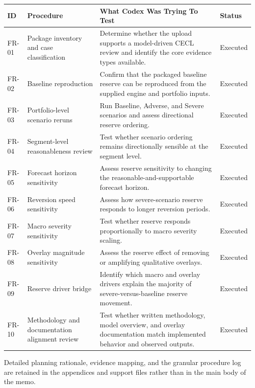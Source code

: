 \documentclass[11pt]{article}
\begin{document}
\begin{center}
\small
\begin{tabularx}{\textwidth}{>{\raggedright\arraybackslash}p{}>{\raggedright\arraybackslash}p{}>{\raggedright\arraybackslash}p{}>{\raggedright\arraybackslash}p{}}
\toprule
ID & Procedure & What Codex Was Trying To Test & Status \\
\midrule
FR-01 & Package inventory and case classification & Determine whether the upload supports a model-driven CECL review and identify the core evidence types available. & Executed \\
FR-02 & Baseline reproduction & Confirm that the packaged baseline reserve can be reproduced from the supplied engine and portfolio inputs. & Executed \\
FR-03 & Portfolio-level scenario reruns & Run Baseline, Adverse, and Severe scenarios and assess directional reserve ordering. & Executed \\
FR-04 & Segment-level reasonableness review & Test whether scenario ordering remains directionally sensible at the segment level. & Executed \\
FR-05 & Forecast horizon sensitivity & Assess reserve sensitivity to changing the reasonable-and-supportable forecast horizon. & Executed \\
FR-06 & Reversion speed sensitivity & Assess how severe-scenario reserve responds to longer reversion periods. & Executed \\
FR-07 & Macro severity sensitivity & Test whether reserve responds proportionally to macro severity scaling. & Executed \\
FR-08 & Overlay magnitude sensitivity & Assess the reserve effect of removing or amplifying qualitative overlays. & Executed \\
FR-09 & Reserve driver bridge & Identify which macro and overlay drivers explain the majority of severe-versus-baseline reserve movement. & Executed \\
FR-10 & Methodology and documentation alignment review & Test whether written methodology, model overview, and overlay documentation match implemented behavior and observed outputs. & Executed \\
\bottomrule
\end{tabularx}
\normalsize
\end{center}
Detailed planning rationale, evidence mapping, and the granular procedure log are retained in the appendices and support files rather than in the main body of the memo.
\end{document}
